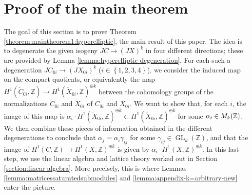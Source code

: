 \documentclass[a4paper,11pt,reqno]{amsart}
\numberwithin{equation}{section}
\theoremstyle{plain}
\theoremstyle{definition}
\newcommand{\Z}{\mathbb Z}
\let\rm\relax
\newcommand{\rm}[1]{{\mathrm{#1}}}
\newcommand{\GL}{\operatorname{GL}}
\newcommand{\wt}[1]{{\widetilde{#1}}}
\newcommand{\set}[1]{\left\{ #1 \right\}}
\begin{document}
\section{Proof of the main theorem} \label{section:maintheorem}

The goal of this section is to prove Theorem \ref{theorem:maintheorem1:hyperelliptic}, the main result of this paper.
The idea is to degenerate the given isogeny $JC \to (JX)^{ k}$ in four different directions; these are provided by Lemma \ref{lemma:hyperelliptic-degeneration}. 
For each such a degeneration $JC_{0i} \to (JX_{0i})^{k}$ ($i \in \set{1,2,3,4}$), we consider the induced map on the compact quotients, or equivalently the map $H^1(\wt C_{0i},\Z) \to H^1(\wt X_{0i},\Z)^{\oplus k}$ between the cohomology groups of the normalizations  $\wt C_{0i}$ and $\wt X_{0i}$ of $C_{0i}$ and $X_{0i}$. We want to show that, for each $i$, the image of this map is $\alpha_i \cdot H^1(\wt X_{0i},\Z)^{\oplus k} \subset H^1(\wt X_{0i},\Z)^{\oplus k}$ for some $\alpha_i \in \rm{M}_k(\Z)$. 
We then combine these pieces of information obtained in the different degenerations to conclude that $\alpha_j = \alpha_i \gamma_{ij}$ for some $\gamma_{ij} \in \GL_k(\Z)$, and that the image of $H^1(C,\Z) \to H^1(X,\Z)^{\oplus k}$ is given by $ \alpha_i \cdot H^1(X,\Z)^{\oplus k}$. In this last step, we use the linear algebra and lattice theory worked out in Section \ref{section:linear-algebra}. More precisely, this is where Lemmas \ref{lemma:matricessaturatedsubmodules} and \ref{lemma:appendix-k=arbitrary-new} enter the picture.  
 
\end{document}
